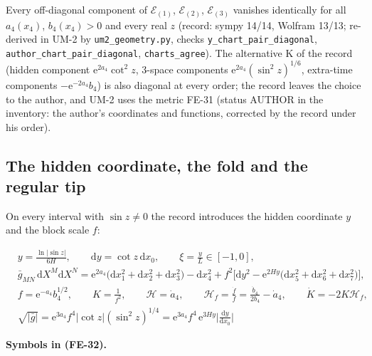 \documentclass[
  10pt,
]{article}
\begin{document}
Every off-diagonal component of \(\mathcal{E}_{(1)}\),
\(\mathcal{E}_{(2)}\), \(\mathcal{E}_{(3)}\) vanishes identically for
all \(a_4(x_4)\), \(b_4(x_4) > 0\) and every real \(z\) (record: sympy
14/14, Wolfram 13/13; re-derived in UM-2 by \texttt{um2\_geometry.py},
checks \texttt{y\_chart\_pair\_diagonal},
\texttt{author\_chart\_pair\_diagonal}, \texttt{charts\_agree}). The
alternative K of the record (hidden component
\(\mathrm{e}^{2a_4}\cot^2z\), 3-space components
\(\mathrm{e}^{2a_4}(\sin^2z)^{1/6}\), extra-time components
\(-\mathrm{e}^{-2a_4}b_4\)) is also diagonal at every order; the record
leaves the choice to the author, and UM-2 uses the metric FE-31 (status
AUTHOR in the inventory: the author's coordinates and functions,
corrected by the record under his order).

\hypertarget{the-hidden-coordinate-the-fold-and-the-regular-tip}{%
\subsection{The hidden coordinate, the fold and the regular
tip}\label{the-hidden-coordinate-the-fold-and-the-regular-tip}}

On every interval with \(\sin z \ne 0\) the record introduces the hidden
coordinate \(y\) and the block scale \(f\):

\[
\begin{aligned}
&y = \frac{\ln\lvert\sin z\rvert}{6H},\qquad \mathrm{d}y = \cot z\,\mathrm{d}x_0,\qquad \xi =
 \frac{y}{L}\in[-1, 0],\\
&\bar g_{MN}\,\mathrm{d}X^M\mathrm{d}X^N = \mathrm{e}^{2a_4}\big(\mathrm{d}x_1^2 + \mathrm{d}x_2^2 +
 \mathrm{d}x_3^2\big)
 - \mathrm{d}x_4^2 + f^2\Big[\mathrm{d}y^2 - \mathrm{e}^{2Hy}\big(\mathrm{d}x_5^2 + \mathrm{d}x_6^2 +
 \mathrm{d}x_7^2\big)\Big],\\
&f = \mathrm{e}^{-a_4}b_4^{1/2},\qquad K = \frac{1}{f^2},\qquad \mathcal{H} = \dot a_4,\qquad
 \mathcal{H}_f = \frac{\dot f}{f} = \frac{\dot b_4}{2b_4} - \dot a_4,\qquad \dot K = -2K\mathcal{H}_f,\\
&\sqrt{\lvert\bar g\rvert} = \mathrm{e}^{3a_4}f^4\lvert\cot z\rvert(\sin^2z)^{1/4}
 = \mathrm{e}^{3a_4}f^4\,\mathrm{e}^{3Hy}\Big\lvert\frac{\mathrm{d}y}{\mathrm{d}x_0}\Big\rvert
\end{aligned} \tag{FE-32}
\]

\textbf{Symbols in (FE-32).}
\end{document}
